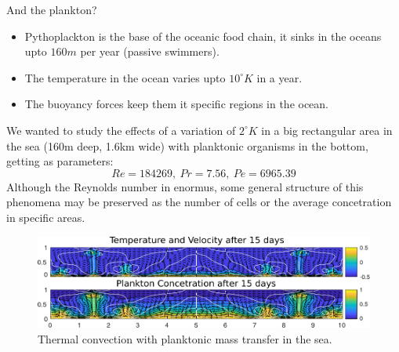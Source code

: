 \documentclass[final]{beamer}
\newlength{\onecolwid}
\begin{document}
\begin{frame}[t]
\begin{columns}[t]
\begin{column}{\onecolwid}

\begin{block}{And the plankton?}
	\begin{itemize}
		\item Pythoplackton is the base of the oceanic food chain, it sinks in the oceans upto $160 m$ per year (passive swimmers).
		\item The temperature in the ocean varies upto $10^{\circ}K$ in a year.
		\item The buoyancy forces keep them it specific regions in the ocean.
	\end{itemize}
	We wanted to study the effects of a variation of $2^{\circ}K$ in a big rectangular area in the sea (160m deep, 1.6km wide) with planktonic organisms in the bottom, getting as parameters:
	$$Re=184269, \: Pr=7.56, \: Pe=6965.39$$
	Although the Reynolds number in enormus, some general structure of this phenomena may be preserved as the number of cells or the average concetration in specific areas.
	
\begin{figure}
\includegraphics[width=1.0\linewidth]{images/planktonSim.pdf}
\caption{Thermal convection with planktonic mass transfer in the sea.}
\end{figure}

\end{block}




\end{column}
\end{columns}
\end{frame}
\end{document}
